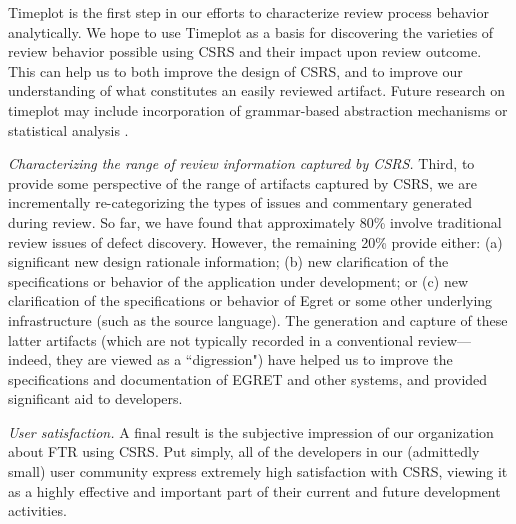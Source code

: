 \begin{itemizenoindent}
Timeplot is the first step in our efforts to characterize review process
behavior analytically.  We hope to use Timeplot as a basis for discovering
the varieties of review behavior possible using CSRS and their impact upon
review outcome.  This can help us to both improve the design of CSRS, and
to improve our understanding of what constitutes an easily reviewed
artifact.  Future research on timeplot may include incorporation of 
grammar-based abstraction mechanisms \cite{Smith91} or statistical
analysis \cite{Gottman90}.  

\item {\em Characterizing the range of review information captured by
  CSRS.} Third, to provide some perspective of the range of artifacts
  captured by CSRS, we are incrementally re-categorizing the types of
  issues and commentary generated during review. So far, we have found that
  approximately 80\% involve traditional review issues of defect discovery.
  However, the remaining 20\% provide either: (a) significant new design
  rationale information; (b) new clarification of the specifications or
  behavior of the application under development; or (c) new clarification
  of the specifications or behavior of Egret or some other underlying
  infrastructure (such as the source language).  The generation and capture
  of these latter artifacts (which are not typically recorded in a
  conventional review---indeed, they are viewed as a ``digression")
  have helped us to improve the specifications and documentation of EGRET
  and other systems, and provided significant aid to developers.
  
\item {\em User satisfaction.} A final result is the subjective impression
  of our organization about FTR using CSRS.  Put simply, all of the
  developers in our (admittedly small) user community express extremely high
  satisfaction with CSRS, viewing it as a highly effective and important part
  of their current and future development activities.

\end{itemizenoindent}






